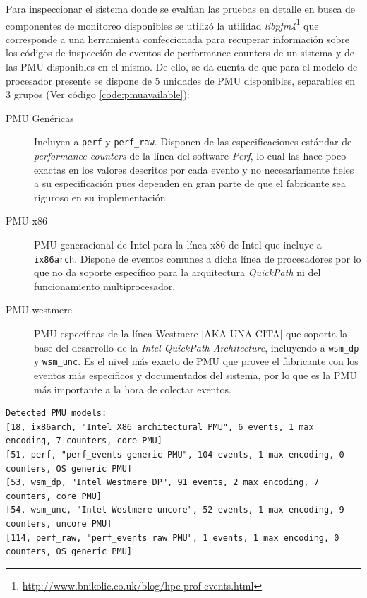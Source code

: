 Para inspeccionar el sistema donde se evalúan las pruebas en detalle en busca de componentes de monitoreo disponibles se utilizó la utilidad \emph{libpfm4}\footnote{\url{http://www.bnikolic.co.uk/blog/hpc-prof-events.html}} que corresponde a una herramienta confeccionada para recuperar información sobre los códigos de inspección de eventos de performance counters de un sistema y de las PMU disponibles en el mismo. De ello, se da cuenta de que para el modelo de procesador presente se dispone de 5 unidades de PMU disponibles, separables en 3 grupos (Ver código \ref{code:pmuavailable}):
\begin{description}
\item[PMU Genéricas] Incluyen a \verb=perf= y  \verb=perf_raw=. Disponen de las especificaciones estándar de \emph{performance counters} de la línea del software \emph{Perf}, lo cual las hace poco exactas en los valores descritos por cada evento y no necesariamente fieles a su especificación pues dependen en gran parte de que el fabricante sea riguroso en su implementación.
\item[PMU x86] PMU generacional de Intel para la línea x86 de Intel que incluye a \verb=ix86arch=. Dispone de eventos comunes a dicha línea de procesadores por lo que no da soporte específico para la arquitectura \emph{QuickPath} ni del funcionamiento multiprocesador.
\item[PMU westmere] PMU específicas de la línea Westmere [AKA UNA CITA] que soporta la base del desarrollo de la \emph{Intel QuickPath Architecture}, incluyendo a \verb=wsm_dp= y \verb=wsm_unc=. Es el nivel más exacto de PMU que provee el fabricante con los eventos más especificos y documentados del sistema, por lo que es la PMU más importante a la hora de colectar eventos.
\end{description}

\vspace{1pc}
\begin{lstlisting}[style=BashInputStyle, label={code:pmuavailable}, caption={Listado de \emph{PMUs} disponibles en el sistema, recuperado con la herramienta \emph{libpfm4}.}, captionpos=b]
	Detected PMU models:
[18, ix86arch, "Intel X86 architectural PMU", 6 events, 1 max encoding, 7 counters, core PMU]
[51, perf, "perf_events generic PMU", 104 events, 1 max encoding, 0 counters, OS generic PMU]
[53, wsm_dp, "Intel Westmere DP", 91 events, 2 max encoding, 7 counters, core PMU]
[54, wsm_unc, "Intel Westmere uncore", 52 events, 1 max encoding, 9 counters, uncore PMU]
[114, perf_raw, "perf_events raw PMU", 1 events, 1 max encoding, 0 counters, OS generic PMU]
\end{lstlisting}


